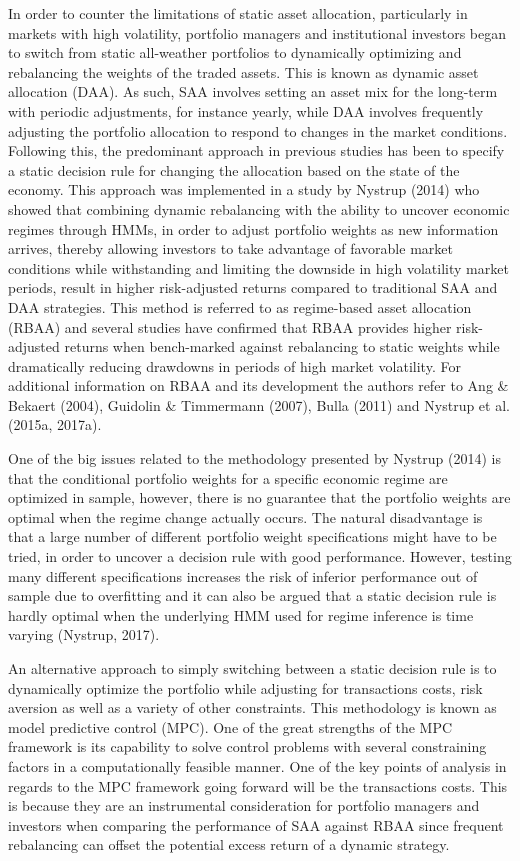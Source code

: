 In order to counter the limitations of static asset allocation, particularly in markets with high volatility, portfolio managers and institutional investors began to switch from static all-weather portfolios to dynamically optimizing and rebalancing the weights of the traded assets. This is known as dynamic asset allocation (DAA). As such, SAA involves setting an asset mix for the long-term with periodic adjustments, for instance yearly, while DAA involves frequently adjusting the portfolio allocation to respond to changes in the market conditions. Following this, the predominant approach in previous studies has been to specify a static decision rule for changing the allocation based on the state of the economy. This approach was implemented in a study by Nystrup (2014) who showed that combining dynamic rebalancing with the ability to uncover economic regimes through HMMs, in order to adjust portfolio weights as new information arrives, thereby allowing investors to take advantage of favorable market conditions while withstanding and limiting the downside in high volatility market periods, result in higher risk-adjusted returns compared to traditional SAA and DAA strategies. This method is referred to as regime-based asset allocation (RBAA) and several studies have confirmed that RBAA provides higher risk-adjusted returns when bench-marked against rebalancing to static weights while dramatically reducing drawdowns in periods of high market volatility. For additional information on RBAA and its development the authors refer to Ang \& Bekaert (2004), Guidolin \& Timmermann (2007), Bulla (2011) and Nystrup et al. (2015a, 2017a). 

One of the big issues related to the methodology presented by Nystrup (2014) is that the conditional portfolio weights for a specific economic regime are optimized in sample, however, there is no guarantee that the portfolio weights are optimal when the regime change actually occurs. The natural disadvantage is that a large number of different portfolio weight specifications might have to be tried, in order to uncover a decision rule with good performance. However, testing many different specifications increases the risk of inferior performance out of sample due to overfitting and it can also be argued that a static decision rule is hardly optimal when the underlying HMM used for regime inference is time varying (Nystrup, 2017).

An alternative approach to simply switching between a static decision rule is to dynamically optimize the portfolio while adjusting for transactions costs, risk aversion as well as a variety of other constraints. This methodology is known as model predictive control (MPC). One of the great strengths of the MPC framework is its capability to solve control problems with several constraining factors in a computationally feasible manner. One of the key points of analysis in regards to the MPC framework going forward will be the transactions costs. This is because they are an instrumental consideration for portfolio managers and investors when comparing the performance of SAA against RBAA since frequent rebalancing can offset the potential excess return of a dynamic strategy. 

